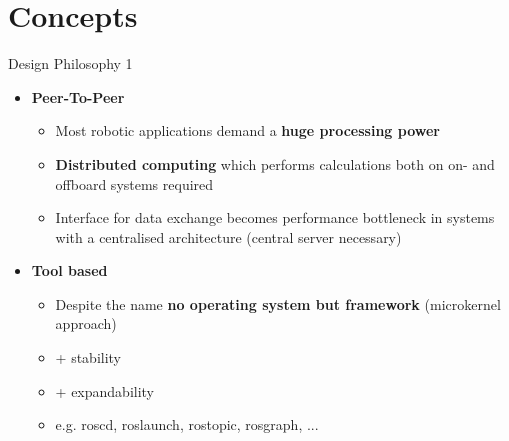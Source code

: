 \documentclass{beamer}
\begin{document}
\section{Concepts}
\begin{frame}{Design Philosophy 1}
 \begin{itemize}
  \item \textbf{Peer-To-Peer}
  \begin{itemize}
   \item Most robotic applications demand a \textbf{huge processing power} 
   \item \textbf{Distributed computing} which performs calculations both on on- and offboard systems required
   \item Interface for data exchange becomes performance bottleneck in systems with a centralised architecture (central server necessary)
  \end{itemize}
 \end{itemize}
 \begin{itemize}
  \item \textbf{Tool based}
  \begin{itemize}
   \item Despite the name \textbf{no operating system but framework} (microkernel approach)
   \item + stability
   \item + expandability
   \item e.g. roscd, roslaunch, rostopic, rosgraph, ...
  \end{itemize}
 \end{itemize}
\end{frame}
\end{document}
